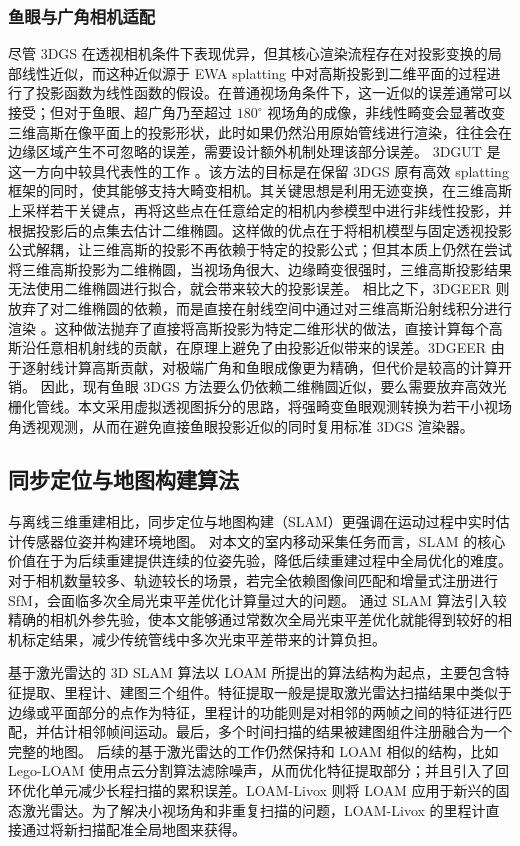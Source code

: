 \subsubsection{鱼眼与广角相机适配}

尽管 3DGS 在透视相机条件下表现优异，但其核心渲染流程存在对投影变换的局部线性近似，而这种近似源于 EWA splatting \cite{zwicker2002ewa} 中对高斯投影到二维平面的过程进行了投影函数为线性函数的假设。在普通视场角条件下，这一近似的误差通常可以接受；但对于鱼眼、超广角乃至超过 \(180^\circ\) 视场角的成像，非线性畸变会显著改变三维高斯在像平面上的投影形状，此时如果仍然沿用原始管线进行渲染，往往会在边缘区域产生不可忽略的误差，需要设计额外机制处理该部分误差。
3DGUT 是这一方向中较具代表性的工作 \cite{wu20253dgut}。该方法的目标是在保留 3DGS 原有高效 splatting 框架的同时，使其能够支持大畸变相机。其关键思想是利用无迹变换，在三维高斯上采样若干关键点，再将这些点在任意给定的相机内参模型中进行非线性投影，并根据投影后的点集去估计二维椭圆。这样做的优点在于将相机模型与固定透视投影公式解耦，让三维高斯的投影不再依赖于特定的投影公式；但其本质上仍然在尝试将三维高斯投影为二维椭圆，当视场角很大、边缘畸变很强时，三维高斯投影结果无法使用二维椭圆进行拟合，就会带来较大的投影误差。
相比之下，3DGEER 则放弃了对二维椭圆的依赖，而是直接在射线空间中通过对三维高斯沿射线积分进行渲染 \cite{huang20253dgeer}。这种做法抛弃了直接将高斯投影为特定二维形状的做法，直接计算每个高斯沿任意相机射线的贡献，在原理上避免了由投影近似带来的误差。3DGEER 由于逐射线计算高斯贡献，对极端广角和鱼眼成像更为精确，但代价是较高的计算开销。
因此，现有鱼眼 3DGS 方法要么仍依赖二维椭圆近似，要么需要放弃高效光栅化管线。本文采用虚拟透视图拆分的思路，将强畸变鱼眼观测转换为若干小视场角透视观测，从而在避免直接鱼眼投影近似的同时复用标准 3DGS 渲染器。

\subsection{同步定位与地图构建算法}

与离线三维重建相比，同步定位与地图构建（SLAM）更强调在运动过程中实时估计传感器位姿并构建环境地图。
对本文的室内移动采集任务而言，SLAM 的核心价值在于为后续重建提供连续的位姿先验，降低后续重建过程中全局优化的难度。对于相机数量较多、轨迹较长的场景，若完全依赖图像间匹配和增量式注册进行 SfM，会面临多次全局光束平差优化计算量过大的问题。
通过 SLAM 算法引入较精确的相机外参先验，使本文能够通过常数次全局光束平差优化就能得到较好的相机标定结果，减少传统管线中多次光束平差带来的计算负担。

基于激光雷达的 3D SLAM 算法以 LOAM \cite{zhang2014loam} 所提出的算法结构为起点，主要包含特征提取、里程计、建图三个组件。特征提取一般是提取激光雷达扫描结果中类似于边缘或平面部分的点作为特征，里程计的功能则是对相邻的两帧之间的特征进行匹配，并估计相邻帧间运动。最后，多个时间扫描的结果被建图组件注册融合为一个完整的地图。
后续的基于激光雷达的工作仍然保持和 LOAM 相似的结构，比如 Lego-LOAM \cite{shan2018lego} 使用点云分割算法滤除噪声，从而优化特征提取部分；并且引入了回环优化单元减少长程扫描的累积误差。LOAM-Livox 则将 LOAM 应用于新兴的固态激光雷达。为了解决小视场角和非重复扫描的问题，LOAM-Livox 的里程计直接通过将新扫描配准全局地图来获得。

